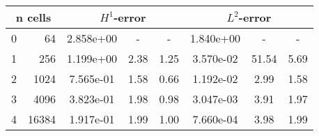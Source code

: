 \documentclass[10pt]{report}
\begin{document}
\begin{table}[H]
\begin{center}
\begin{tabular}{|c|r|c|c|c|c|c|c|} \hline

\multicolumn{2}{|c|}{n cells} & 
\multicolumn{3}{|c|}{$H^1$-error} & 
\multicolumn{3}{|c|}{$L^2$-error}\\ \hline
0 & 64 & 2.858e+00 & - & - & 1.840e+00 & - & -\\ \hline
1 & 256 & 1.199e+00 & 2.38 & 1.25 & 3.570e-02 & 51.54 & 5.69\\ \hline
2 & 1024 & 7.565e-01 & 1.58 & 0.66 & 1.192e-02 & 2.99 & 1.58\\ \hline
3 & 4096 & 3.823e-01 & 1.98 & 0.98 & 3.047e-03 & 3.91 & 1.97\\ \hline
4 & 16384 & 1.917e-01 & 1.99 & 1.00 & 7.660e-04 & 3.98 & 1.99\\ \hline
\end{tabular}
\end{center}
\end{table}
\end{document}
